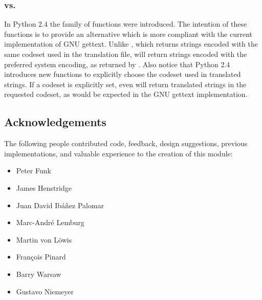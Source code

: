 \subsubsection{ vs. }
In Python 2.4 the  family of functions were
introduced. The intention of these functions is to provide an
alternative which is more compliant with the current
implementation of GNU gettext. Unlike , which
returns strings encoded with the same codeset used in the
translation file,  will return strings
encoded with the preferred system encoding, as returned by
. Also notice that
Python 2.4 introduces new functions to explicitly choose
the codeset used in translated strings. If a codeset is explicitly
set, even  will return translated strings in
the requested codeset, as would be expected in the GNU gettext
implementation.

\subsection{Acknowledgements}

The following people contributed code, feedback, design suggestions,
previous implementations, and valuable experience to the creation of
this module:

\begin{itemize}
    \item Peter Funk
    \item James Henstridge
    \item Juan David Ib\'a\~nez Palomar
    \item Marc-Andr\'e Lemburg
    \item Martin von L\"owis
    \item Fran\c cois Pinard
    \item Barry Warsaw
    \item Gustavo Niemeyer
\end{itemize}
